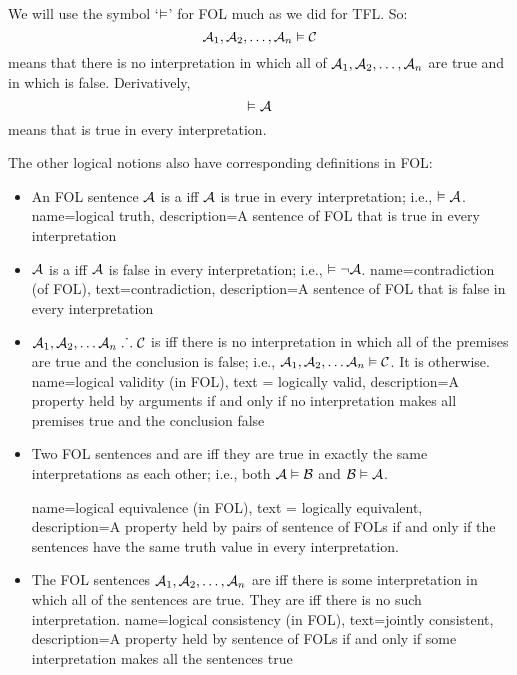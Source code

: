 We will use the symbol `$\vDash$' for FOL much as we did for TFL. So:
	$$\mathcal{A}_1, \mathcal{A}_2, \ldots, \mathcal{A}_n \vDash\mathcal{C}$$
means that there is no interpretation in which all of $\mathcal{A}_1, \mathcal{A}_2, \ldots, \mathcal{A}_n$ are true and in which  is false. Derivatively,
	$$\vDash\mathcal{A}$$
means that  is true in every interpretation.

The other logical notions also have corresponding definitions in FOL:

\begin{itemize}
\item An FOL sentence $\mathcal{A}$ is a  iff $\mathcal{A}$ is true in every interpretation; i.e.,  $\vDash\mathcal{A}$.
{
name=logical truth,
description={A \gls{sentence of FOL} that is true in every \gls{interpretation}}
}

\item $\mathcal{A}$ is a  iff $\mathcal{A}$ is false in every interpretation; i.e., $\vDash\neg\mathcal{A}$.
{
  name=contradiction (of FOL),
  text=contradiction,
description={A \gls{sentence of FOL} that is false in every \gls{interpretation}}
}
  
\item $\mathcal{A}_1, \mathcal{A}_2, \ldots \mathcal{A}_n \mathrel{\ldotp\dot{}\,\ldotp} \mathcal{C}$ is  iff there is no interpretation in which all of the premises are true and the conclusion is false; i.e., $\mathcal{A}_1,\mathcal{A}_2,\ldots \mathcal{A}_n \vDash\mathcal{C}$. It is  otherwise.
{
  name=logical validity (in FOL),
  text = logically valid,
description={A property held by arguments if and only if no \gls{interpretation} makes all premises true and the conclusion false}
}

\item Two FOL sentences  and  are  iff they are true in exactly the same interpretations as each other; i.e., both $\mathcal{A}\vDash\mathcal{B}$ and $\mathcal{B}\vDash\mathcal{A}$.

{
  name=logical equivalence (in FOL),
  text = logically equivalent,
description={A property held by pairs of \glspl{sentence of FOL} if and only if the sentences have the same truth value in every \gls{interpretation}.}
}

\item The FOL sentences $\mathcal{A}_1,\mathcal{A}_2,\ldots, \mathcal{A}_n$ are  iff there is some interpretation in which all of the sentences are true. They are  iff there is no such interpretation.
{
  name=logical consistency (in FOL),
  text=jointly consistent,
description={A property held by \glspl{sentence of FOL} if and only if some \gls{interpretation} makes all the sentences true}
}
\end{itemize}

